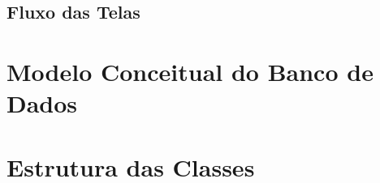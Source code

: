 \subsection{Fluxo das Telas}

\section{Modelo Conceitual do Banco de Dados}
\section{Estrutura das Classes}
